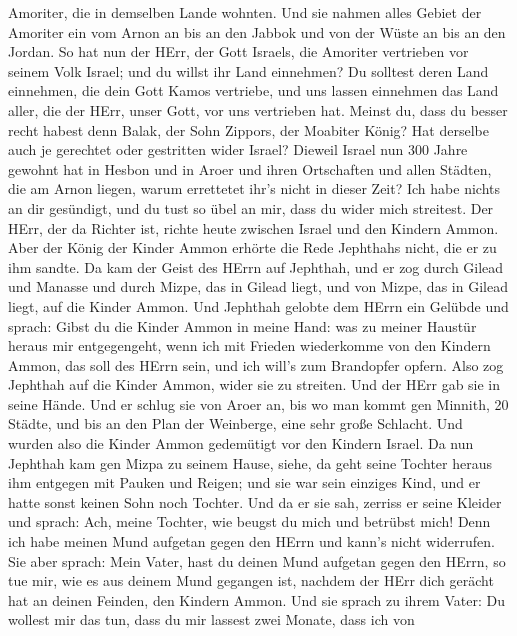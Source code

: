 Amoriter, die in demselben Lande wohnten.  Und sie nahmen
alles Gebiet der Amoriter ein vom Arnon an bis an den Jabbok und von der
Wüste an bis an den Jordan.  So hat nun der HErr, der Gott
Israels, die Amoriter vertrieben vor seinem Volk Israel; und du willst
ihr Land einnehmen?  Du solltest deren Land einnehmen, die
dein Gott Kamos vertriebe, und uns lassen einnehmen das Land aller, die
der HErr, unser Gott, vor uns vertrieben hat.  Meinst du,
dass du besser recht habest denn Balak, der Sohn Zippors, der Moabiter
König? Hat derselbe auch je gerechtet oder gestritten wider Israel?
 Dieweil Israel nun 300 Jahre gewohnt hat in Hesbon und in
Aroer und ihren Ortschaften und allen Städten, die am Arnon liegen,
warum errettetet ihr's nicht in dieser Zeit?  Ich habe
nichts an dir gesündigt, und du tust so übel an mir, dass du wider mich
streitest. Der HErr, der da Richter ist, richte heute zwischen Israel
und den Kindern Ammon.  Aber der König der Kinder Ammon
erhörte die Rede Jephthahs nicht, die er zu ihm sandte.  Da
kam der Geist des HErrn auf Jephthah, und er zog durch Gilead und
Manasse und durch Mizpe, das in Gilead liegt, und von Mizpe, das in
Gilead liegt, auf die Kinder Ammon.  Und Jephthah gelobte
dem HErrn ein Gelübde und sprach: Gibst du die Kinder Ammon in meine
Hand:  was zu meiner Haustür heraus mir entgegengeht, wenn
ich mit Frieden wiederkomme von den Kindern Ammon, das soll des HErrn
sein, und ich will's zum Brandopfer opfern.  Also zog
Jephthah auf die Kinder Ammon, wider sie zu streiten. Und der HErr gab
sie in seine Hände.  Und er schlug sie von Aroer an, bis wo
man kommt gen Minnith, 20 Städte, und bis an den Plan der Weinberge,
eine sehr große Schlacht. Und wurden also die Kinder Ammon gedemütigt
vor den Kindern Israel.  Da nun Jephthah kam gen Mizpa zu
seinem Hause, siehe, da geht seine Tochter heraus ihm entgegen mit
Pauken und Reigen; und sie war sein einziges Kind, und er hatte sonst
keinen Sohn noch Tochter.  Und da er sie sah, zerriss er
seine Kleider und sprach: Ach, meine Tochter, wie beugst du mich und
betrübst mich! Denn ich habe meinen Mund aufgetan gegen den HErrn und
kann's nicht widerrufen.  Sie aber sprach: Mein Vater, hast
du deinen Mund aufgetan gegen den HErrn, so tue mir, wie es aus deinem
Mund gegangen ist, nachdem der HErr dich gerächt hat an deinen Feinden,
den Kindern Ammon.  Und sie sprach zu ihrem Vater: Du
wollest mir das tun, dass du mir lassest zwei Monate, dass ich von
